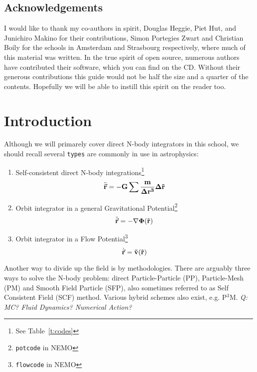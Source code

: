 \section*{Acknowledgements}

I would like to thank my co-authors in spirit, 
Douglas Heggie, Piet Hut, and Junichiro Makino for their contributions, 
Simon Portegies Zwart and Christian Boily for the schools in Amsterdam 
and Strasbourg respectively, where much of this material was written.
In the true spirit of open source, 
numerous authors have contributed their software, which you can find on
the CD. Without their generous contributions this guide would not be
half the size and a quarter of the contents.
Hopefully we will be able to instill this spirit on the reader too.



\chapter                {Introduction}

Although we will primarely cover direct N-body integrators in this school,
we should recall several {\tt types} are commonly in use
in astrophysics:

\begin{enumerate}
\item
Self-consistent direct N-body integrations\footnote{See Table~\ref{t:codes}}
\begin{equation}
    \ddot{\vec{\bf r}} = -G \sum{ {m\over{\Delta r^3}} \Delta \vec{\bf r}}
\end{equation}

\item
Orbit integrator in a general Gravitational Potential\footnote{{\tt potcode} in NEMO}
\begin{equation}
    \ddot{\vec{\bf r}} = -\nabla \Phi(\vec{\bf r})
\end{equation}

\item
Orbit integrator in a Flow Potential\footnote{{\tt flowcode} in NEMO}
\begin{equation}
    \dot{\vec{\bf r}} = \vec{\bf v}(\vec{\bf r})
\end{equation}


\end{enumerate}

Another way to divide up the field is by methodologies. There are arguably
three ways to solve the N-body problem: direct Particle-Particle (PP),
Particle-Mesh (PM) and Smooth Field Particle (SFP), also sometimes 
referred to as Self Consistent Field (SCF) method. Various hybrid schemes
also exist, e.g. P$^3$M.
\smallskip
{\it Q: MC? Fluid Dynamics? Numerical Action?}

